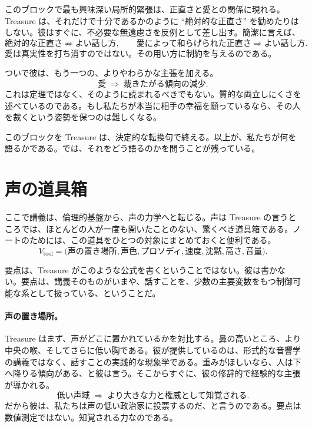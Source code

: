 このブロックで最も興味深い局所的緊張は、正直さと愛との関係に現れる。Treasure は、それだけで十分であるかのように ``絶対的な正直さ'' を勧めたりはしない。彼はすぐに、不必要な無遠慮さを反例として差し出す。簡潔に言えば、
\begin{equation}
\text{絶対的な正直さ} \not\Rightarrow \text{よい話し方},
\qquad
\text{愛によって和らげられた正直さ} \Rightarrow \text{よい話し方}.
\end{equation}
愛は真実性を打ち消すのではない。その用い方に制約を与えるのである。

ついで彼は、もう一つの、よりやわらかな主張を加える。
\begin{equation}
\text{愛} \;\Rightarrow\; \text{裁きたがる傾向の減少}.
\end{equation}
これは定理ではなく、そのように読まれるべきでもない。質的な両立しにくさを述べているのである。もし私たちが本当に相手の幸福を願っているなら、その人を裁くという姿勢を保つのは難しくなる。

このブロックを Treasure は、決定的な転換句で終える。以上が、私たちが何を語るかである。では、それをどう語るのかを問うことが残っている。

\section{声の道具箱}

ここで講義は、倫理的基盤から、声の力学へと転じる。声は Treasure の言うところでは、ほとんどの人が一度も開いたことのない、驚くべき道具箱である。ノートのためには、この道具をひとつの対象にまとめておくと便利である。
\begin{equation}
V_{\text{tool}}=
\bigl(
\text{声の置き場所},
\text{声色},
\text{プロソディ},
\text{速度},
\text{沈黙},
\text{高さ},
\text{音量}
\bigr).
\end{equation}

要点は、Treasure がこのような公式を書くということではない。彼は書かない。要点は、講義そのものがいまや、話すことを、少数の主要変数をもつ制御可能な系として扱っている、ということだ。

\paragraph{声の置き場所。} Treasure はまず、声がどこに置かれているかを対比する。鼻の高いところ、より中央の喉、そしてさらに低い胸である。彼が提供しているのは、形式的な音響学の講義ではなく、話すことの実践的な現象学である。重みがほしいなら、人は下へ降りる傾向がある、と彼は言う。そこからすぐに、彼の修辞的で経験的な主張が導かれる。
\begin{equation}
\text{低い声域} \;\Rightarrow\; \text{より大きな力と権威として知覚される}.
\end{equation}
だから彼は、私たちは声の低い政治家に投票するのだ、と言うのである。要点は数値測定ではない。知覚される力なのである。

